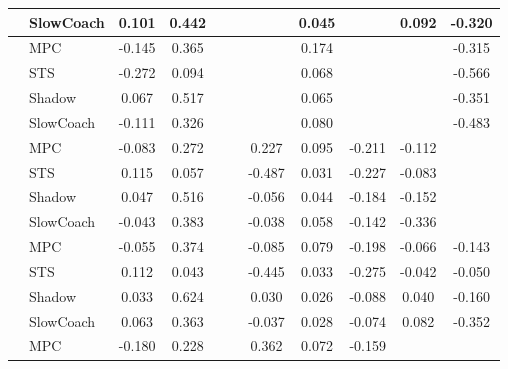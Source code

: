 \begin{tabular}{|l|l|*{9}{c|}}
                                                           & SlowCoach &    0.101 &     0.442 &        &     &     &  0.045 &      &   0.092 &   -0.320 \\
\midrule
[True, True, False, False, False, True, False, False, True] & MPC &   -0.145 &     0.365 &        &     &     &  0.174 &      &      &   -0.315 \\
                                                           & STS &   -0.272 &     0.094 &        &     &     &  0.068 &      &      &   -0.566 \\
                                                           & Shadow &    0.067 &     0.517 &        &     &     &  0.065 &      &      &   -0.351 \\
                                                           & SlowCoach &   -0.111 &     0.326 &        &     &     &  0.080 &      &      &   -0.483 \\
\midrule
[True, True, False, False, True, True, True, True, False] & MPC &   -0.083 &     0.272 &        &     &  0.227 &  0.095 &  -0.211 &  -0.112 &       \\
                                                           & STS &    0.115 &     0.057 &        &     & -0.487 &  0.031 &  -0.227 &  -0.083 &       \\
                                                           & Shadow &    0.047 &     0.516 &        &     & -0.056 &  0.044 &  -0.184 &  -0.152 &       \\
                                                           & SlowCoach &   -0.043 &     0.383 &        &     & -0.038 &  0.058 &  -0.142 &  -0.336 &       \\
\midrule
[True, True, False, False, True, True, True, True, True] & MPC &   -0.055 &     0.374 &        &     & -0.085 &  0.079 &  -0.198 &  -0.066 &   -0.143 \\
                                                           & STS &    0.112 &     0.043 &        &     & -0.445 &  0.033 &  -0.275 &  -0.042 &   -0.050 \\
                                                           & Shadow &    0.033 &     0.624 &        &     &  0.030 &  0.026 &  -0.088 &   0.040 &   -0.160 \\
                                                           & SlowCoach &    0.063 &     0.363 &        &     & -0.037 &  0.028 &  -0.074 &   0.082 &   -0.352 \\
\midrule
[True, True, False, False, True, True, True, False, False] & MPC &   -0.180 &     0.228 &        &     &  0.362 &  0.072 &  -0.159 &      &       \\

\end{tabular}
